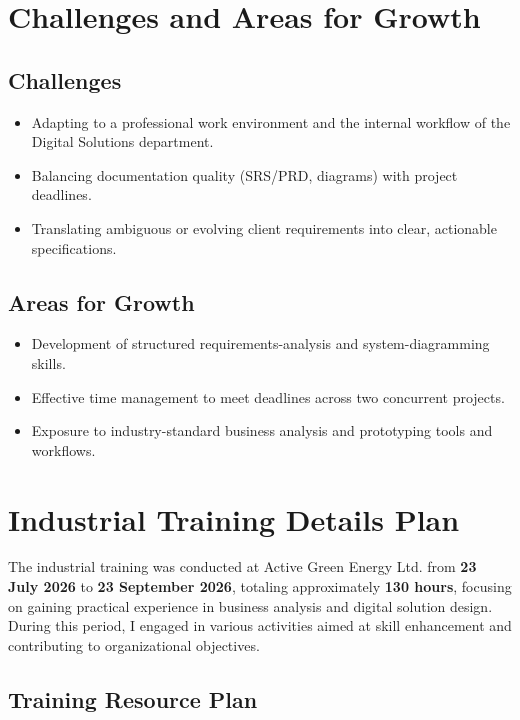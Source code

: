 \section{Challenges and Areas for Growth}

\subsection{Challenges}
\begin{itemize}
    \item Adapting to a professional work environment and the internal workflow of the Digital Solutions department.
    \item Balancing documentation quality (SRS/PRD, diagrams) with project deadlines.
    \item Translating ambiguous or evolving client requirements into clear, actionable specifications.
\end{itemize}

\subsection{Areas for Growth}
\begin{itemize}
    \item Development of structured requirements-analysis and system-diagramming skills.
    \item Effective time management to meet deadlines across two concurrent projects.
    \item Exposure to industry-standard business analysis and prototyping tools and workflows.
\end{itemize}


\section{Industrial Training Details Plan}

\par The industrial training was conducted at Active Green Energy Ltd. from \textbf{23 July 2026} to \textbf{23 September 2026}, totaling approximately \textbf{130 hours}, focusing on gaining practical experience in business analysis and digital solution design. During this period, I engaged in various activities aimed at skill enhancement and contributing to organizational objectives.

\subsection{Training Resource Plan}

